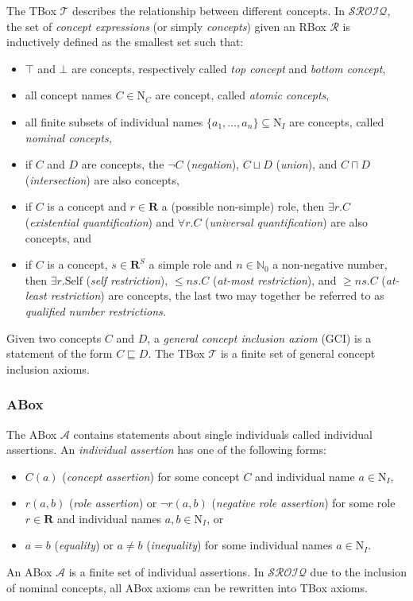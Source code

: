 The TBox $\mathcal{T}$ describes the relationship between different concepts. In $\mathcal{SROIQ}$, the set of \emph{concept expressions} (or simply \emph{concepts}) given an RBox $\mathcal{R}$ is inductively defined as the smallest set such that:

\begin{itemize}
    \item $\top$ and $\bot$ are concepts, respectively called \emph{top concept} and \emph{bottom concept},
    \item all concept names $C \in \mathrm{N}_C$ are concept, called \emph{atomic concepts},
    \item all finite subsets of individual names $\{ a_1, \dots, a_n \} \subseteq \mathrm{N}_I$ are concepts, called \emph{nominal concepts,}
    \item if $C$ and $D$ are concepts, the $\lnot C$ (\emph{negation}), $C \sqcup D$ (\emph{union}), and $C \sqcap D$ (\emph{intersection}) are also concepts,
    \item if $C$ is a concept and $r \in \mathbf{R}$ a (possible non-simple) role, then $\exists r . C$ (\emph{existential quantification}) and $\forall r . C$ (\emph{universal quantification}) are also concepts, and
    \item if $C$ is a concept, $s \in \mathbf{R}^S$ a simple role and $n \in \mathbb{N}_0$ a non-negative number, then $\exists r . \mathrm{Self}$ (\emph{self restriction}), $\leq n s . C$ (\emph{at-most restriction}), and $\geq n s. C$ (\emph{at-least restriction}) are concepts, the last two may together be referred to as \emph{qualified number restrictions.}
\end{itemize}

Given two concepts $C$ and $D$, a \emph{general concept inclusion axiom} (GCI) is a statement of the form $C \sqsubseteq D$. The TBox $\mathcal{T}$ is a finite set of general concept inclusion axioms.

\subsubsection{ABox} \label{abox}

The ABox $\mathcal{A}$ contains statements about single individuals called individual assertions. An \emph{individual assertion} has one of the following forms:

\begin{itemize}
    \item $C(a)$ (\emph{concept assertion}) for some concept $C$ and individual name $a \in \mathrm{N}_I$,
    \item $r(a, b)$ (\emph{role assertion}) or $\lnot r (a, b)$ (\emph{negative role assertion}) for some role $r \in \mathbf{R}$ and individual names $a, b \in \mathrm{N}_I$, or
    \item $a = b$ (\emph{equality}) or $a \not = b$ (\emph{inequality}) for some individual names $a \in \mathrm{N}_I$.
\end{itemize}

An ABox $\mathcal{A}$ is a finite set of individual assertions. In $\mathcal{SROIQ}$ due to the inclusion of nominal concepts, all ABox axioms can be rewritten into TBox axioms.

